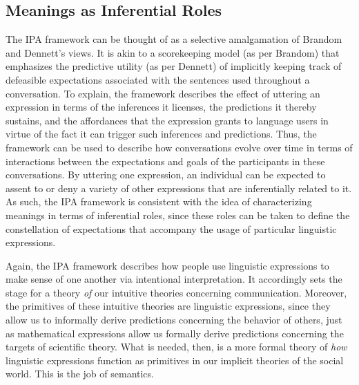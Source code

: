\subsection{Meanings as Inferential Roles}

The IPA framework can be thought of as a selective amalgamation of Brandom and Dennett's views. It is akin to a scorekeeping model (as per Brandom) that emphasizes the predictive utility (as per Dennett) of implicitly keeping track of defeasible expectations associated with the sentences used throughout a conversation. To explain, the framework describes the effect of uttering an expression in terms of the inferences it licenses, the predictions it thereby sustains, and the affordances that the expression grants to language users in virtue of the fact it can trigger such inferences and predictions. Thus, the framework can be used to describe how conversations evolve over time in terms of interactions between the expectations and goals of the participants in these conversations. By uttering one expression, an individual can be expected to assent to or deny a variety of other expressions that are inferentially related to it. As such, the IPA framework is consistent with the idea of characterizing meanings in terms of inferential roles, since these roles can be taken to define the constellation of expectations that accompany the usage of particular linguistic expressions. 

Again, the IPA framework describes how people use linguistic expressions to make sense of one another via intentional interpretation. It accordingly sets the stage for a theory \textit{of} our intuitive theories concerning communication. Moreover, the primitives of these intuitive theories are linguistic expressions, since they allow us to informally derive predictions concerning the behavior of others, just as mathematical expressions allow us formally derive predictions concerning the targets of scientific theory. What is needed, then, is a more formal theory of \textit{how} linguistic expressions function as primitives in our implicit theories of the social world. This is the job of semantics.

